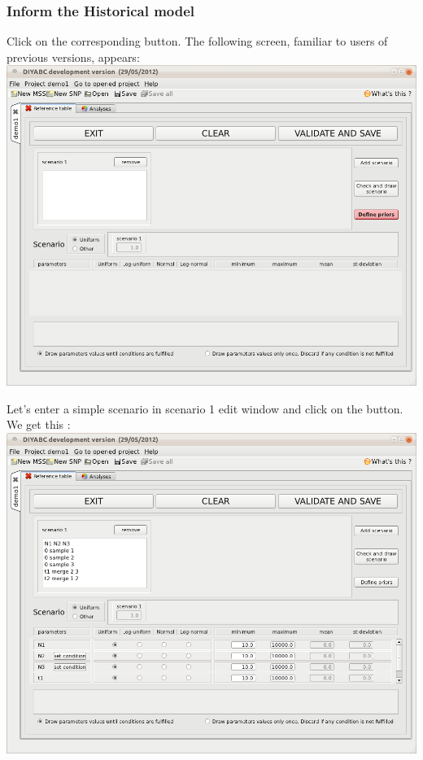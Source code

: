 \subsubsection{Inform the Historical model}
Click on the corresponding  button. The following screen, familiar to users of previous versions, appears:\\

\includegraphics[scale=0.35]{gui_pictures/Capture-DIYABC-11.png} 

Let's enter a simple scenario in scenario 1 edit window and click on the  button. We get this :\\

\includegraphics[scale=0.35]{gui_pictures/Capture-DIYABC-12.png} 

